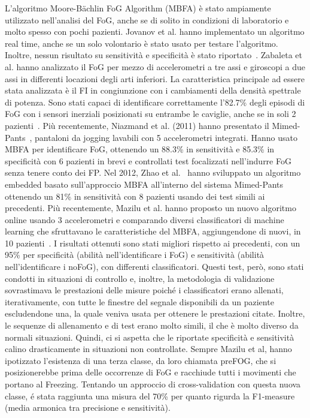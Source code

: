 L'algoritmo Moore-Bächlin FoG Algorithm (MBFA) è stato ampiamente utilizzato nell'analisi del FoG, anche se di solito in condizioni di laboratorio e molto spesso con pochi pazienti. Jovanov et al. hanno implementato un algoritmo real time, anche se un solo volontario è stato usato per testare l'algoritmo. Inoltre, nessun risultato su sensitività e specificità è stato riportato~\cite{22}. Zabaleta et al. hanno analizzato il FoG per mezzo di accelerometri a tre assi e giroscopi a due assi in differenti locazioni degli arti inferiori. La caratteristica principale ad essere stata analizzata è il FI in congiunzione con i cambiamenti della densità spettrale di potenza. Sono stati capaci di identificare correttamente l'82.7\% degli episodi di FoG con i sensori inerziali posizionati su entrambe le caviglie, anche se in soli 2 pazienti~\cite{24}.  \newline
Più recentemente, Niazmand et al. (2011) hanno presentato il Mimed-Pants~\cite{26}, pantaloni da jogging lavabili con 5 accelerometri integrati. Hanno usato MBFA per identificare FoG, ottenendo un 88.3\% in sensitività e 85.3\% in specificità con 6 pazienti in brevi e controllati test focalizzati nell'indurre FoG senza tenere conto dei FP. Nel 2012, Zhao et al.~\cite{46} hanno sviluppato un algoritmo embedded basato sull'approccio MBFA all'interno del sistema Mimed-Pants ottenendo un 81\% in sensitività con 8 pazienti usando dei test simili ai precedenti. Più recentemente, Mazilu et al. hanno proposto un nuovo algoritmo online usando 3 accelerometri e comparando diversi classificatori di machine learning che sfruttavano le caratteristiche del MBFA, aggiungendone di nuovi, in 10 pazienti~\cite{48}. I risultati ottenuti sono stati migliori rispetto ai precedenti, con un 95\% per specificità (abilità nell'identificare i FoG) e sensitività (abilità nell'identificare i noFoG), con differenti classificatori. Questi test, però, sono stati condotti in situazioni di controllo e, inoltre, la metodologia di validazione sovrastimava le prestazioni delle misure poiché i classificatori erano allenati, iterativamente, con tutte le finestre del segnale disponibili da un paziente escludendone una, la quale veniva usata per ottenere le prestazioni citate. Inoltre, le sequenze di allenamento e di test erano molto simili, il che è molto diverso da normali situazioni. Quindi, ci si aspetta che le riportate specificità e sensitività calino drasticamente in situazioni non controllate. Sempre Mazilu et al, hanno ipotizzato l'esistenza di una terza classe, da loro chiamata preFOG, che si posizionerebbe prima delle occorrenze di FoG e racchiude tutti i movimenti che portano al Freezing. Tentando un approccio di cross-validation con questa nuova classe, é stata raggiunta una misura del 70\% per quanto rigurda la F1-measure (media armonica tra precisione e sensitività).~\cite{12} \newline
